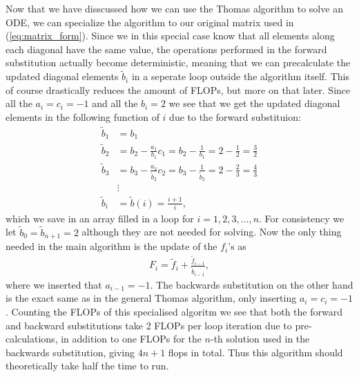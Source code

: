 \documentclass[twocolumn]{aastex62}
\begin{document}
Now that we have disscussed how we can use the Thomas algorithm to solve an ODE, we can specialize the algorithm to our original matrix used in (\ref{eq:matrix_form}). Since we in this special case know that all elements along each diagonal have the same value, the operations performed in the forward substitution actually become deterministic, meaning that we can precalculate the updated diagonal elements $\tilde{b}_i$ in a seperate loop outside the algorithm itself. This of course drastically reduces the amount of FLOPs, but more on that later. Since all the $a_i = c_i = -1$ and all the $b_i = 2$ we see that we get the updated diagonal elements in the following function of $i$ due to the forward substituion:
\begin{align}
	\tilde{b}_1 &= b_1\\
	\tilde{b}_2 &= b_2 - \frac{a_1}{b_1}c_1 = b_2 - \frac{1}{b_1} = 2 - \frac{1}{2} = \frac{3}{2}\\
	\tilde{b}_3 &= b_3 - \frac{a_2}{\tilde{b}_2}c_2 = b_3 - \frac{1}{\tilde{b}_2} = 2 - \frac{2}{3} = \frac{4}{3}\\
	&\vdots\\
	\tilde{b}_i &= \tilde{b}(i) = \frac{i + 1}{i},
\end{align} 
which we save in an array filled in a loop for $i = 1, 2, 3,\ldots, n$. For consistency we let $\tilde{b}_0 = \tilde{b}_{n+1} = 2$ although they are not needed for solving. Now the only thing needed in the main algorithm is the update of the $f_i$'s as 
\begin{align}
	F_i = \tilde{f}_i + \frac{\tilde{f}_{i-1}}{\tilde{b}_{i-1}},
\end{align}
where we inserted that $a_{i-1} = -1$.
The backwards substitution on the other hand is the exact same as in the general Thomas algorithm, only inserting $a_i = c_i = -1$.
Counting the FLOPs of this specialised algoritm we see that both the forward and backward substitutions take 2 FLOPs per loop iteration due to pre-calculations, in addition to one FLOPs for the $n$-th solution used in the backwards substitution, giving $4n + 1$ flops in total. Thus this algorithm should theoretically take half the time to run.
\end{document}
